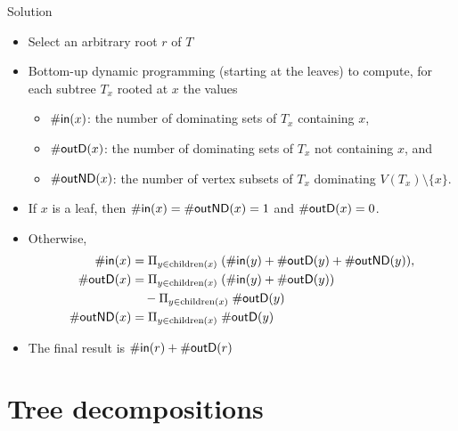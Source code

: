 \begin{frame}{Solution}
	\begin{itemize}
		\item Select an arbitrary root $r$ of $T$
		\item Bottom-up dynamic programming (starting at the leaves) to compute, for each subtree $T_x$ rooted at $x$ the values
		\begin{itemize}
			\item $\mathsf{\#in}(x)$: the number of dominating sets of $T_x$ containing $x$,
			\item $\mathsf{\#outD}(x)$: the number of dominating sets of $T_x$ not containing $x$, and
			\item $\mathsf{\#outND}(x)$: the number of vertex subsets of $T_x$ dominating $V(T_x)\setminus \{x\}$.
		\end{itemize}
		\item If $x$ is a leaf, then $\mathsf{\#in}(x)=\mathsf{\#outND}(x)=1$ and $\mathsf{\#outD}(x)=0$.
		\item Otherwise, 
		\begin{align*}
		 \mathsf{\#in}(x) &= \Pi_{y \in \text{children} (x)} \; (\mathsf{\#in}(y)+\mathsf{\#outD}(y)+\mathsf{\#outND}(y)),\\
		 \mathsf{\#outD}(x) &= \Pi_{y \in \text{children} (x)} \; (\mathsf{\#in}(y)+\mathsf{\#outD}(y))\\ &\quad - \Pi_{y \in \text{children} (x)} \; \mathsf{\#outD}(y)\\
		 \mathsf{\#outND}(x) &= \Pi_{y \in \text{children} (x)} \; \mathsf{\#outD}(y)
		\end{align*}
		\item The final result is $\mathsf{\#in}(r)+\mathsf{\#outD}(r)$
	\end{itemize}
\end{frame}

\section{Tree decompositions}


